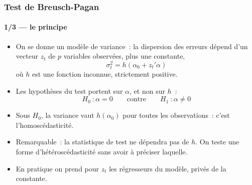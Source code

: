\documentclass[10pt]{beamer}
\begin{document}
\begin{frame}
  \frametitle{Test de Breusch-Pagan}
  \framesubtitle{1/3 --- le principe}

  \begin{itemize}

  \item On se donne un modèle de variance~: la dispersion des erreurs dépend
    d'un vecteur $z_t$ de $p$ variables observées, plus une constante,
    \[
      \sigma_t^2 = h\left(\alpha_0 + z_t'\alpha\right)
    \]
    où $h$ est une fonction inconnue, strictement positive.\newline

  \item Les hypothèses du test portent sur $\alpha$, et non sur $h$~:
    \[
      H_0~: \alpha = 0 \qquad\text{contre}\qquad H_1~: \alpha \neq 0
    \]

  \item Sous $H_0$, la variance vaut $h(\alpha_0)$ pour toutes les
    observations~: c'est l'homoscédasticité.\newline

  \item[$\Rightarrow$] Remarquable~: la statistique de test ne dépendra pas
    de $h$. On teste une forme d'hétéroscédasticité sans avoir à préciser
    laquelle.\newline

  \item En pratique on prend pour $z_t$ les régresseurs du modèle, privés de la
    constante.

  \end{itemize}

\end{frame}
\end{document}
